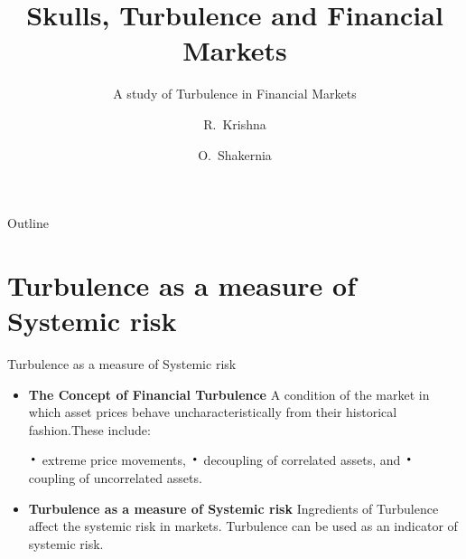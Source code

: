 \documentclass{beamer}
\title{Skulls, Turbulence and Financial Markets}
\subtitle{A study of Turbulence in Financial Markets}
\author{R.~Krishna\inst{} \and O.~Shakernia\inst{1}}
\institute[Universities of Somewhere and Elsewhere] %
{
  \inst{}%
  \and
  \inst{1}%
  Vice President Research\\
  Research Affiliates}
\date{}
\newcommand*{\LargerCdot}{\raisebox{-0.25ex}{\scalebox{2.3}{$\cdot$}}}
\begin{document}
\begin{frame}
  \titlepage
\end{frame}

\begin{frame}{Outline}
	 		\tableofcontents
\end{frame}

	\section{Turbulence as a measure of Systemic risk}

\begin{frame}{Turbulence as a measure of Systemic risk}{}
  	\begin{itemize}
  		\item {\textbf{The Concept of Financial Turbulence} \newline
 		}
		A condition of the market in which asset prices behave \alert{uncharacteristically} from their historical fashion.These 	include:
		\begin{description}
			{$\LargerCdot$ extreme price movements, \newline $\LargerCdot$ 	decoupling of correlated assets, and \newline $\LargerCdot$ 								              			coupling of uncorrelated assets.} \newline
		\end{description} 
		\item{\textbf{Turbulence as a measure of Systemic risk} \newline}
		Ingredients of Turbulence affect the systemic risk in markets.\newline
		Turbulence can be used as an indicator of systemic risk.
  	\end{itemize}
\end{frame}
\end{document}
